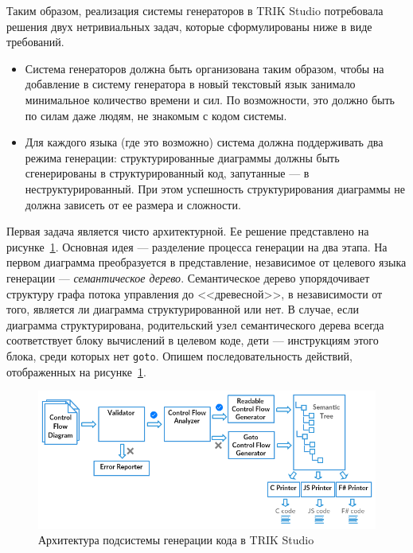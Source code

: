\documentclass[a5paper]{article}
\begin{document}
Таким образом, реализация системы генераторов в TRIK Studio потребовала решения двух нетривиальных задач, которые сформулированы ниже в виде требований.

\begin{itemize}
    \item Система генераторов должна быть организована таким образом, чтобы на добавление в систему генератора в новый текстовый язык занимало минимальное количество времени и сил. По возможности, это должно быть по силам даже людям, не знакомым с кодом системы.
    \item Для каждого языка (где это возможно) система должна поддерживать два режима генерации: структурированные диаграммы должны быть сгенерированы в структурированный код, запутанные --- в неструктурированный. При этом успешность структурирования диаграммы не должна зависеть от ее размера и сложности.
\end{itemize}

Первая задача является чисто архитектурной. Ее решение представлено на рисунке~\ref{image:generatorsArchitecture}. Основная идея --- разделение процесса генерации на два этапа. На первом диаграмма преобразуется в представление, независимое от целевого языка генерации --- \textit{семантическое дерево}. Семантическое дерево упорядочивает структуру графа потока управления до <<древесной>>, в независимости от того, является ли диаграмма структурированной или нет. В случае, если диаграмма структурирована, родительский узел семантического дерева всегда соответствует блоку вычислений в целевом коде, дети --- инструкциям этого блока, среди которых нет \texttt{goto}. Опишем последовательность действий, отображенных на рисунке~\ref{image:generatorsArchitecture}.

\begin{figure}[ht]
    \centering
    \includegraphics[width=4.5in]{TS_Generators_Architecture.png}
    \caption{Архитектура подсистемы генерации кода в TRIK Studio}
    \label{image:generatorsArchitecture}
\end{figure}
\end{document}
